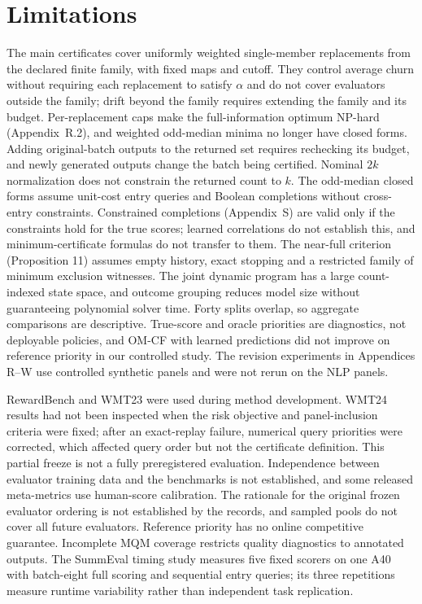 \documentclass[11pt]{article}
\begin{document}
\section*{Limitations}
The main certificates cover uniformly weighted single-member replacements from the declared finite family, with fixed maps and cutoff. They control average churn without requiring each replacement to satisfy $\alpha$ and do not cover evaluators outside the family; drift beyond the family requires extending the family and its budget. Per-replacement caps make the full-information optimum NP-hard (Appendix~R.2), and weighted odd-median minima no longer have closed forms. Adding original-batch outputs to the returned set requires rechecking its budget, and newly generated outputs change the batch being certified. Nominal $2k$ normalization does not constrain the returned count to $k$. The odd-median closed forms assume unit-cost entry queries and Boolean completions without cross-entry constraints. Constrained completions (Appendix~S) are valid only if the constraints hold for the true scores; learned correlations do not establish this, and minimum-certificate formulas do not transfer to them. The near-full criterion (Proposition 11) assumes empty history, exact stopping and a restricted family of minimum exclusion witnesses. The joint dynamic program has a large count-indexed state space, and outcome grouping reduces model size without guaranteeing polynomial solver time. Forty splits overlap, so aggregate comparisons are descriptive. True-score and oracle priorities are diagnostics, not deployable policies, and OM-CF with learned predictions did not improve on reference priority in our controlled study. The revision experiments in Appendices R--W use controlled synthetic panels and were not rerun on the NLP panels.

RewardBench and WMT23 were used during method development. WMT24 results had not been inspected when the risk objective and panel-inclusion criteria were fixed; after an exact-replay failure, numerical query priorities were corrected, which affected query order but not the certificate definition. This partial freeze is not a fully preregistered evaluation. Independence between evaluator training data and the benchmarks is not established, and some released meta-metrics use human-score calibration. The rationale for the original frozen evaluator ordering is not established by the records, and sampled pools do not cover all future evaluators. Reference priority has no online competitive guarantee. Incomplete MQM coverage restricts quality diagnostics to annotated outputs. The SummEval timing study measures five fixed scorers on one A40 with batch-eight full scoring and sequential entry queries; its three repetitions measure runtime variability rather than independent task replication.
\end{document}
